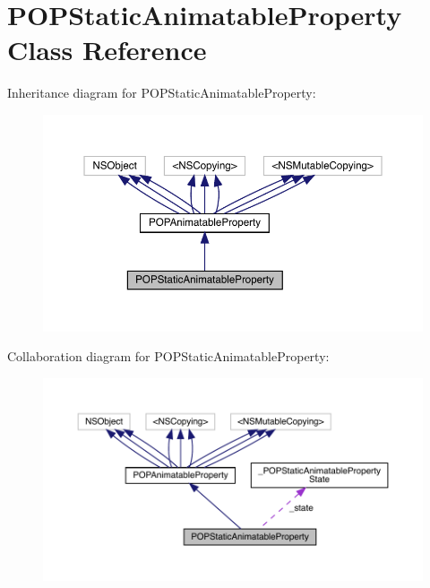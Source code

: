 \hypertarget{interface_p_o_p_static_animatable_property}{}\section{P\+O\+P\+Static\+Animatable\+Property Class Reference}
\label{interface_p_o_p_static_animatable_property}


Inheritance diagram for P\+O\+P\+Static\+Animatable\+Property\+:\nopagebreak
\begin{figure}[H]
\begin{center}
\leavevmode
\includegraphics[width=350pt]{interface_p_o_p_static_animatable_property__inherit__graph}
\end{center}
\end{figure}


Collaboration diagram for P\+O\+P\+Static\+Animatable\+Property\+:\nopagebreak
\begin{figure}[H]
\begin{center}
\leavevmode
\includegraphics[width=350pt]{interface_p_o_p_static_animatable_property__coll__graph}
\end{center}
\end{figure}
